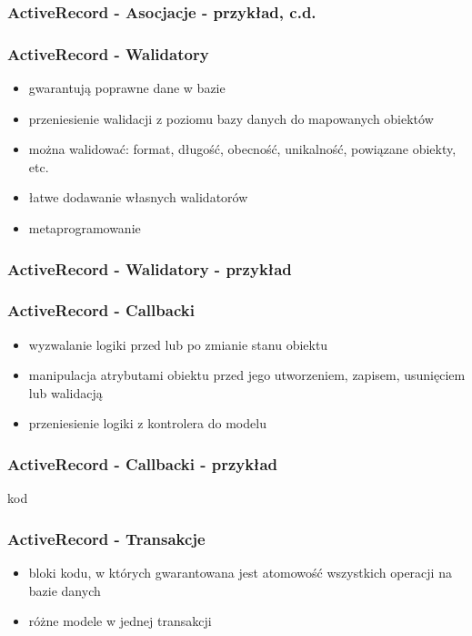 \documentclass[12t]{beamer}
\begin{document}
\begin{frame}[fragile]
  \frametitle{ActiveRecord - Asocjacje - przykład, c.d.}
  
\end{frame}

\begin{frame}
  \frametitle{ActiveRecord - Walidatory}
  \begin{itemize}
  \item gwarantują poprawne dane w bazie
  \item przeniesienie walidacji z poziomu bazy danych do mapowanych
    obiektów
  \item można walidować: format, długość, obecność, unikalność,
    powiązane obiekty, etc.
  \item łatwe dodawanie własnych walidatorów
  \item metaprogramowanie
  \end{itemize}
\end{frame}

\begin{frame}
  \frametitle{ActiveRecord - Walidatory - przykład}
  
\end{frame}

\begin{frame}
  \frametitle{ActiveRecord - Callbacki}
  \begin{itemize}
  \item wyzwalanie logiki przed lub po zmianie stanu obiektu
  \item manipulacja atrybutami obiektu przed jego utworzeniem,
    zapisem, usunięciem lub walidacją
  \item przeniesienie logiki z kontrolera do modelu
  \end{itemize}
\end{frame}

\begin{frame}
  \frametitle{ActiveRecord - Callbacki - przykład}
  kod
\end{frame}

\begin{frame}
  \frametitle{ActiveRecord - Transakcje}
  \begin{itemize}
  \item bloki kodu, w których gwarantowana jest atomowość wszystkich
    operacji na bazie danych
  \item różne modele w jednej transakcji
  \end{itemize}
\end{frame}
\end{document}
